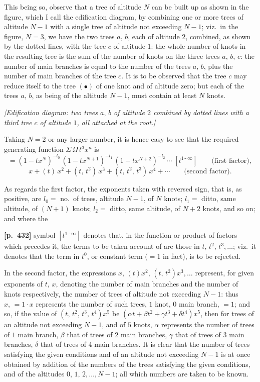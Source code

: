 \documentclass[11pt,a4paper]{article}
\begin{document}
This being so, observe that a tree of altitude $N$ can be built up as shown in the figure, which I call the edification diagram, by combining one or more trees of altitude $N-1$ with a single tree of altitude not exceeding $N-1$; viz.\ in the figure, $N=3$, we have the two trees $a,\,b$, each of altitude $2$, combined, as shown by the dotted lines, with the tree $c$ of altitude $1$: the whole number of knots in the resulting tree is the sum of the number of knots on the three trees $a,\,b,\,c$: the number of main branches is equal to the number of the trees $a,\,b$, plus the number of main branches of the tree $c$. It is to be observed that the tree $c$ may reduce itself to the tree $(\bullet)$ of one knot and of altitude zero; but each of the trees $a,\,b$, as being of the altitude $N-1$, must contain at least $N$ knots.

\begin{center}
\textit{[Edification diagram: two trees $a,\,b$ of altitude $2$ combined by dotted lines with a third tree $c$ of altitude $1$, all attached at the root.]}
\end{center}

Taking $N=2$ or any larger number, it is hence easy to see that the required generating function $\Sigma\,\Omega\,t^{a} x^{n}$ is
\[
= (1-tx^{N})^{-l_{0}}\,(1-tx^{N+1})^{-l_{1}}\,(1-tx^{N+2})^{-l_{2}}\,\cdots\;[t^{1\cdots\infty}]\qquad\text{(first factor)},
\]
\[
x + (t)\,x^{2} + (t,\,t^{2})\,x^{3} + (t,\,t^{2},\,t^{3})\,x^{4} + \cdots\qquad\text{(second factor).}
\]

As regards the first factor, the exponents taken with reversed sign, that is, as positive, are $l_{0} =$ no.\ of trees, altitude $N-1$, of $N$ knots; $l_{1} =$ ditto, same altitude, of $(N+1)$ knots; $l_{2} =$ ditto, same altitude, of $N+2$ knots, and so on; and where the

\bigskip
\noindent\textbf{[p.~432]}\quad
symbol $[t^{1\cdots\infty}]$ denotes that, in the function or product of factors which precedes it, the terms to be taken account of are those in $t,\,t^{2},\,t^{3},\ldots$; viz.\ it denotes that the term in $t^{0}$, or constant term ($=1$ in fact), is to be rejected.

In the second factor, the expressions $x,\,(t)x^{2},\,(t,\,t^{2})x^{3},\ldots$ represent, for given exponents of $t,\,x$, denoting the number of main branches and the number of knots respectively, the number of trees of altitude not exceeding $N-1$: thus $x,\,=1\cdot x$ represents the number of such trees, $1$ knot, $0$ main branch, $=1$; and so, if the value of $(t,\,t^{2},\,t^{3},\,t^{4})x^{5}$ be $(\alpha t + \beta t^{2} + \gamma t^{3} + \delta t^{4})x^{5}$, then for trees of an altitude not exceeding $N-1$, and of $5$ knots, $\alpha$ represents the number of trees of $1$ main branch, $\beta$ that of trees of $2$ main branches, $\gamma$ that of trees of $3$ main branches, $\delta$ that of trees of $4$ main branches. It is clear that the number of trees satisfying the given conditions and of an altitude not exceeding $N-1$ is at once obtained by addition of the numbers of the trees satisfying the given conditions, and of the altitudes $0,\,1,\,2,\ldots,N-1$; all which numbers are taken to be known.
\end{document}
